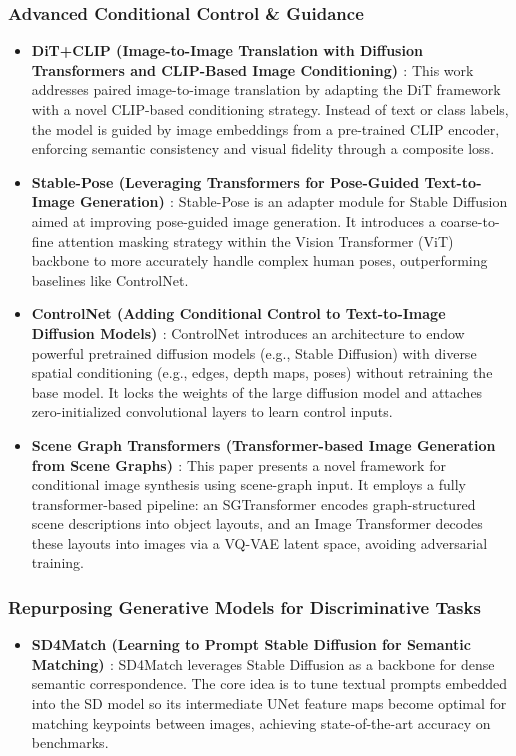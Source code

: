 \documentclass[a4paper]{article}
\begin{document}
\subsubsection{Advanced Conditional Control \& Guidance}
\begin{itemize}
    \item \textbf{DiT+CLIP (Image-to-Image Translation with Diffusion Transformers and CLIP-Based Image Conditioning) \cite{Zhu2025ImageToImage}}: This work addresses paired image-to-image translation by adapting the DiT framework with a novel CLIP-based conditioning strategy. Instead of text or class labels, the model is guided by image embeddings from a pre-trained CLIP encoder, enforcing semantic consistency and visual fidelity through a composite loss.
    \item \textbf{Stable-Pose (Leveraging Transformers for Pose-Guided Text-to-Image Generation) \cite{Wang2024StablePose}}: Stable-Pose is an adapter module for Stable Diffusion aimed at improving pose-guided image generation. It introduces a coarse-to-fine attention masking strategy within the Vision Transformer (ViT) backbone to more accurately handle complex human poses, outperforming baselines like ControlNet.
    \item \textbf{ControlNet (Adding Conditional Control to Text-to-Image Diffusion Models) \cite{Zhang2023ControlNet}}: ControlNet introduces an architecture to endow powerful pretrained diffusion models (e.g., Stable Diffusion) with diverse spatial conditioning (e.g., edges, depth maps, poses) without retraining the base model. It locks the weights of the large diffusion model and attaches zero-initialized convolutional layers to learn control inputs.
    \item \textbf{Scene Graph Transformers (Transformer-based Image Generation from Scene Graphs) \cite{Sortino2023TransformerSceneGraphs}}: This paper presents a novel framework for conditional image synthesis using scene-graph input. It employs a fully transformer-based pipeline: an SGTransformer encodes graph-structured scene descriptions into object layouts, and an Image Transformer decodes these layouts into images via a VQ-VAE latent space, avoiding adversarial training.
\end{itemize}

\subsubsection{Repurposing Generative Models for Discriminative Tasks}
\begin{itemize}
    \item \textbf{SD4Match (Learning to Prompt Stable Diffusion for Semantic Matching) \cite{Li2023SD4Match}}: SD4Match leverages Stable Diffusion as a backbone for dense semantic correspondence. The core idea is to tune textual prompts embedded into the SD model so its intermediate UNet feature maps become optimal for matching keypoints between images, achieving state-of-the-art accuracy on benchmarks.
\end{itemize}
\end{document}
